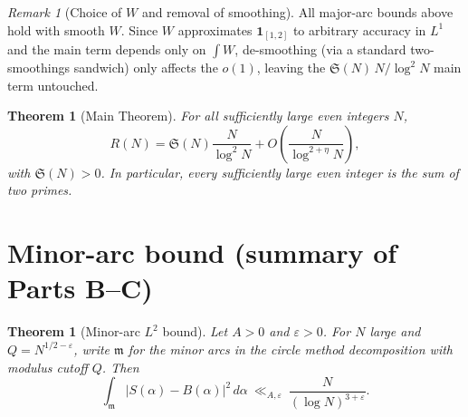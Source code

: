 \documentclass[11pt]{article}
\newtheorem{theorem}[lemma]{Theorem}
\theoremstyle{definition}
\theoremstyle{remark}
\newtheorem{remark}[lemma]{Remark}
\numberwithin{equation}{part}
\begin{document}
\begin{remark}[Choice of $W$ and removal of smoothing]
	All major-arc bounds above hold with smooth $W$.
	Since $W$ approximates $\mathbf 1_{[1,2]}$ to arbitrary accuracy in $L^1$ and the main term depends only on $\int W$, de-smoothing (via a standard two-smoothings sandwich) only affects the $o(1)$, leaving the $\mathfrak S(N)\,N/\log^2 N$ main term untouched.
\end{remark}

\begin{theorem}[Main Theorem]
	For all sufficiently large even integers $N$,
	\[
		R(N)=\mathfrak S(N)\frac{N}{\log^2 N}
		+ O\!\left(\frac{N}{\log^{2+\eta}N}\right),
	\]
	with $\mathfrak S(N)>0$.
	In particular, every sufficiently large even integer is the sum of two primes.
\end{theorem}


\section{Minor-arc bound (summary of Parts B--C)}

\begin{theorem}[Minor-arc $L^2$ bound]\label{thm:minor-L2}
	Let $A>0$ and $\varepsilon>0$. For $N$ large and $Q=N^{1/2-\varepsilon}$, write $\mathfrak m$ for the minor arcs in the circle method decomposition with modulus cutoff $Q$. Then
	\begin{equation}\label{eq:minor-L2}
		\int_{\mathfrak m} \big|S(\alpha)-B(\alpha)\big|^2\,d\alpha \ \ll_{A,\varepsilon}\ \frac{N}{(\log N)^{3+\varepsilon}}.
	\end{equation}
\end{theorem}
\end{document}
